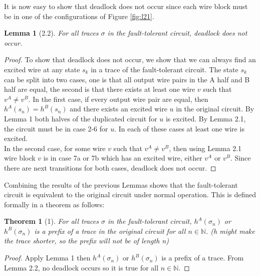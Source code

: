 \documentclass[12pt]{report}
\newtheorem*{theorem}{Theorem}
\newtheorem*{lemma}{Lemma}
\begin{document}
It is now easy to show that deadlock does not occur since each wire block must be in one of the configurations of Figure \ref{fig:l21}.
\begin{lemma}[2.2]
For all traces $\sigma$ in the fault-tolerant circuit, deadlock does not occur.
\end{lemma}
\begin{proof}
To show that deadlock does not occur, we show that we can always find an excited wire at any state $s_k$ in a trace of the fault-tolerant circuit.  The state $s_k$ can be split into two cases, one is that all output wire pairs in the A half and B half are equal, the second is that there exists at least one wire $v$ such that $v^A\neq v^B$.  In the first case, if every output wire pair are equal, then $h^A(s_n)=h^B(s_n)$ and there exists an excited wire $u$ in the original circuit.  By Lemma 1 both halves of the duplicated circuit for $u$ is excited.  By Lemma 2.1, the circuit must be in case 2-6 for $u$.  In each of these cases at least one wire is excited.  \\
In the second case, for some wire $v$ such that $v^A\neq v^B$, then using Lemma 2.1 wire block $v$ is in case 7a or 7b which has an excited wire, either $v^A$ or $v^B$.  Since there are next transitions for both cases, deadlock does not occur.
\end{proof}

Combining the results of the previous Lemmas shows that the fault-tolerant circuit is equivalent to the original circuit under normal operation.  This is defined formally in a theorem as follows:
\begin{theorem}[1]
For all traces $\sigma$ in the fault-tolerant circuit, $h^{A}(\sigma_n)$ or $h^{B}(\sigma_n)$ is a prefix of a trace in the original circuit for all $n \in \mathbb{N}$.  (h might make the trace shorter, so the prefix will not be of length n) %
\end{theorem}
\begin{proof}
Apply Lemma 1 then $h^{A}(\sigma_n)$ or $h^{B}(\sigma_n)$ is a prefix of a trace.  From Lemma 2.2, no deadlock occurs so it is true for all $n\in \mathbb{N}$.
\end{proof}
\end{document}
